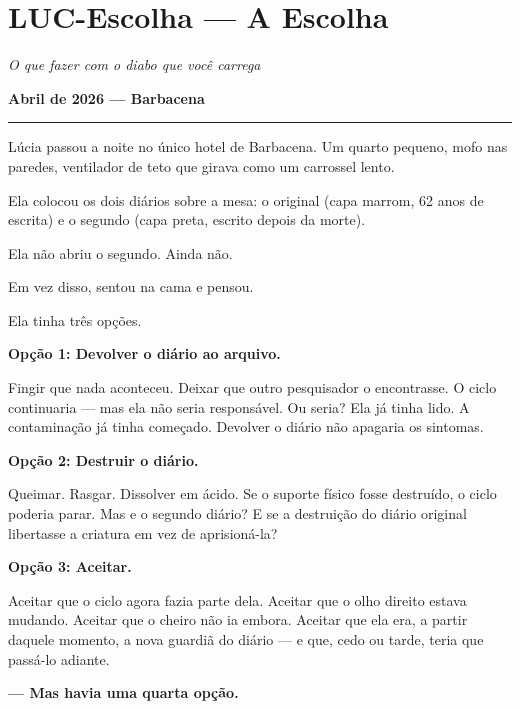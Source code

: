 \section*{\textbf{LUC-Escolha} --- A Escolha}

\noindent \textit{O que fazer com o diabo que você carrega}

\noindent \textbf{Abril de 2026 --- Barbacena}

\vspace{0.5em}\noindent\rule{\textwidth}{0.5pt}\vspace{0.5em}

\noindent Lúcia passou a noite no único hotel de Barbacena. Um quarto pequeno, mofo nas paredes, ventilador de teto que girava como um carrossel lento.

\noindent Ela colocou os dois diários sobre a mesa: o original (capa marrom, 62 anos de escrita) e o segundo (capa preta, escrito depois da morte).

\noindent Ela não abriu o segundo. Ainda não.

\noindent Em vez disso, sentou na cama e pensou.

\noindent Ela tinha três opções.

\noindent \textbf{Opção 1: Devolver o diário ao arquivo.}

\noindent Fingir que nada aconteceu. Deixar que outro pesquisador o encontrasse. O ciclo continuaria --- mas ela não seria responsável. Ou seria? Ela já tinha lido. A contaminação já tinha começado. Devolver o diário não apagaria os sintomas.

\noindent \textbf{Opção 2: Destruir o diário.}

\noindent Queimar. Rasgar. Dissolver em ácido. Se o suporte físico fosse destruído, o ciclo poderia parar. Mas e o segundo diário? E se a destruição do diário original libertasse a criatura em vez de aprisioná-la?

\noindent \textbf{Opção 3: Aceitar.}

\noindent Aceitar que o ciclo agora fazia parte dela. Aceitar que o olho direito estava mudando. Aceitar que o cheiro não ia embora. Aceitar que ela era, a partir daquele momento, a nova guardiã do diário --- e que, cedo ou tarde, teria que passá-lo adiante.

\noindent \textbf{--- Mas havia uma quarta opção.}

